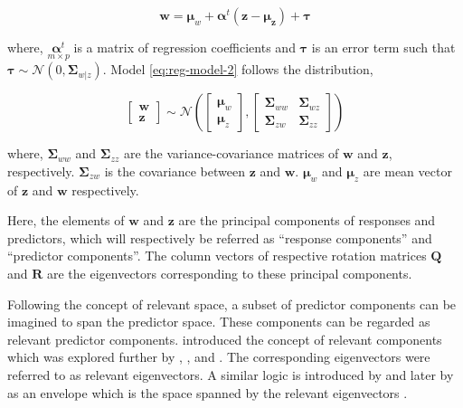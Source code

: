 \documentclass[12pt,3p,authoryear]{elsarticle}
\begin{document}
\begin{equation}
\mathbf{w} = \boldsymbol{\mu}_w + \boldsymbol{\alpha}^t(\mathbf{z} - \boldsymbol{\mu_z}) + \boldsymbol{\tau}
\label{eq:reg-model-2}
\end{equation}

where, \(\underset{m\times p}{\boldsymbol{\alpha}^t}\) is a matrix of
regression coefficients and \(\boldsymbol{\tau}\) is an error term such
that
\(\boldsymbol{\tau} \sim \mathcal{N}(0, \boldsymbol{\Sigma}_{w|z})\).
Model \eqref{eq:reg-model-2} follows the distribution,

\begin{equation}
  \begin{bmatrix}
    \mathbf{w} \\ \mathbf{z}
  \end{bmatrix} \sim \mathcal{N}
  \left(
    \begin{bmatrix}
      \boldsymbol{\mu}_w \\
      \boldsymbol{\mu}_z
    \end{bmatrix},
    \begin{bmatrix}
    \boldsymbol{\Sigma}_{ww} & \boldsymbol{\Sigma}_{wz} \\
    \boldsymbol{\Sigma}_{zw} & \boldsymbol{\Sigma}_{zz}
    \end{bmatrix}
  \right)
  \label{eq:model-2}
\end{equation}

where, \(\boldsymbol{\Sigma}_{ww}\) and \(\boldsymbol{\Sigma}_{zz}\) are
the variance-covariance matrices of \(\mathbf{w}\) and \(\mathbf{z}\),
respectively. \(\boldsymbol{\Sigma}_{zw}\) is the covariance between
\(\mathbf{z}\) and \(\mathbf{w}\). \(\boldsymbol{\mu}_w\) and
\(\boldsymbol{\mu}_z\) are mean vector of \(\mathbf{z}\) and
\(\mathbf{w}\) respectively.

Here, the elements of \(\mathbf{w}\) and \(\mathbf{z}\) are the
principal components of responses and predictors, which will
respectively be referred as ``response components'' and ``predictor
components''. The column vectors of respective rotation matrices
\(\mathbf{Q}\) and \(\mathbf{R}\) are the eigenvectors corresponding to
these principal components.

Following the concept of relevant space, a subset of predictor
components can be imagined to span the predictor space. These components
can be regarded as relevant predictor components. \citet{Naes1985}
introduced the concept of relevant components which was explored further
by \citet{helland1990partial}, \citet{naes1993relevant},
\citet{Helland1994b} and \citet{Helland2000}. The corresponding
eigenvectors were referred to as relevant eigenvectors. A similar logic
is introduced by \citet{cook2010envelope} and later by
\citet{cook2013envelopes} as an envelope which is the space spanned by
the relevant eigenvectors \citep[pp.~101]{cook2018envelope}.
\end{document}
